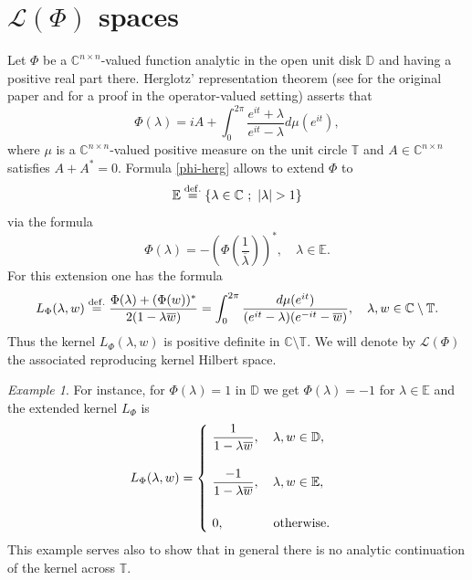 \documentclass[12pt]{amsart}
\theoremstyle{definition}
\theoremstyle{remark}
\newtheorem{ex}[thm]{Example}
\numberwithin{equation}{section}
\begin{document}
\section{$\mathcal L(\Phi)$ spaces}
\setcounter{equation}{0}
\label{sec-2}
Let $\Phi$ be a $\mathbb C^{n\times n}$-valued function analytic in the open unit disk $\mathbb D$ and having  a positive real part there. Herglotz'
representation theorem (see \cite{hspnw,herglotz} for the original paper and \cite{MR48:904} for a proof in the operator-valued setting)  asserts that
\begin{equation}
\label{phi-herg}
\Phi({\lambda})=iA+\int_{0}^{2\pi}\frac{e^{it}+{\lambda}}{e^{it}-{\lambda}}d\mu(e^{it}),
\end{equation}
where $\mu$ is a $\mathbb C^{n\times n}$-valued positive measure on the unit circle $\mathbb T$ and $A\in\mathbb C^{n\times n}$ satisfies $A+A^*=0$.
Formula \eqref{phi-herg} allows to extend $\Phi$ to
\[
\mathbb E\stackrel{\rm def.}{=}\left\{{\lambda}\in\mathbb C\,\,;\,\, |{\lambda}|>1\right\}
\]
via the formula
\begin{equation}
  \label{2-2}
\Phi({\lambda})=-\left(\Phi\left(\frac{1}{\overline{{\lambda}}}\right)\right)^*,\quad {\lambda}\in\mathbb E.
  \end{equation}
For this extension one has the formula
\begin{equation}
  \label{ext-2-2}
  L_\Phi({\lambda},w)\stackrel{\rm def.}{=}    \frac{\Phi({\lambda})+(\Phi(w))^*}{2(1-{\lambda}\overline{w})}=\int_0^{2\pi}\frac{d\mu(e^{it})}{(e^{it}-{\lambda})(e^{-it}-\overline{w})},\quad {\lambda},w\in
  \mathbb C\setminus      \mathbb T.
    \end{equation}
    Thus the kernel $L_\Phi({\lambda},w)$ is positive definite in  $\mathbb C\setminus      \mathbb T$. We will denote by $\mathcal L(\Phi)$
    the associated reproducing kernel Hilbert space.\smallskip

    \begin{ex}
      \label{exexex}
    For instance, for $\Phi({\lambda})=1$ in $\mathbb D$ we get $\Phi(\lambda)=-1$ for ${\lambda}\in\mathbb E$ and the extended kernel $L_\Phi$  is
    \begin{equation}
      \label{1/2}
      L_\Phi(\lambda,w)=    \begin{cases}\,\, \dfrac{1}{1-\lambda\overline{w}},\quad \lambda,w\in\mathbb D,\\
        \\
        \,\, \dfrac{-1}{1-\lambda{\overline{w}}},\quad \lambda,w\in\mathbb E,\\  \\
        \,\, 0,\,\,\hspace{12.3mm}{\rm otherwise.}\end{cases}
      \end{equation}
This example serves also to show that in general there is no analytic continuation of the kernel across $\mathbb T$.
\end{ex}
\end{document}
